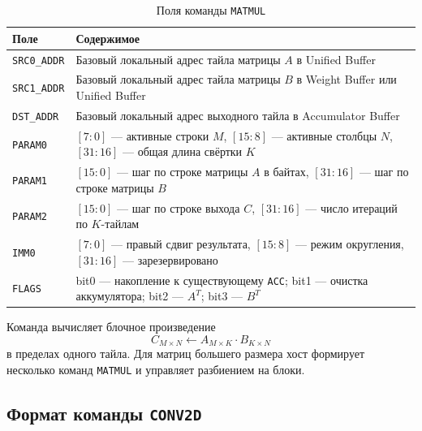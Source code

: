 \documentclass[12pt,a4paper]{article}
\begin{document}
\begin{table}[H]
    \centering
    \caption{Поля команды \texttt{MATMUL}}
    \begin{tabular}{|L{2.6cm}|L{10.1cm}|}
        \hline
        \textbf{Поле} & \textbf{Содержимое} \\
        \hline
        \texttt{SRC0\_ADDR} & Базовый локальный адрес тайла матрицы \(A\) в Unified Buffer \\
        \hline
        \texttt{SRC1\_ADDR} & Базовый локальный адрес тайла матрицы \(B\) в Weight Buffer или Unified Buffer \\
        \hline
        \texttt{DST\_ADDR} & Базовый локальный адрес выходного тайла в Accumulator Buffer \\
        \hline
        \texttt{PARAM0} & \([7:0]\) --- активные строки \(M\), \([15:8]\) --- активные столбцы \(N\), \([31:16]\) --- общая длина свёртки \(K\) \\
        \hline
        \texttt{PARAM1} & \([15:0]\) --- шаг по строке матрицы \(A\) в байтах, \([31:16]\) --- шаг по строке матрицы \(B\) \\
        \hline
        \texttt{PARAM2} & \([15:0]\) --- шаг по строке выхода \(C\), \([31:16]\) --- число итераций по \(K\)-тайлам \\
        \hline
        \texttt{IMM0} & \([7:0]\) --- правый сдвиг результата, \([15:8]\) --- режим округления, \([31:16]\) --- зарезервировано \\
        \hline
        \texttt{FLAGS} & bit0 --- накопление к существующему \texttt{ACC}; bit1 --- очистка аккумулятора; bit2 --- \(A^T\); bit3 --- \(B^T\) \\
        \hline
    \end{tabular}
\end{table}

Команда вычисляет блочное произведение
\[
C_{M \times N} \leftarrow A_{M \times K} \cdot B_{K \times N}
\]
в пределах одного тайла. Для матриц большего размера хост формирует несколько команд \texttt{MATMUL} и управляет разбиением на блоки.

\subsection{Формат команды \texttt{CONV2D}}
\end{document}
